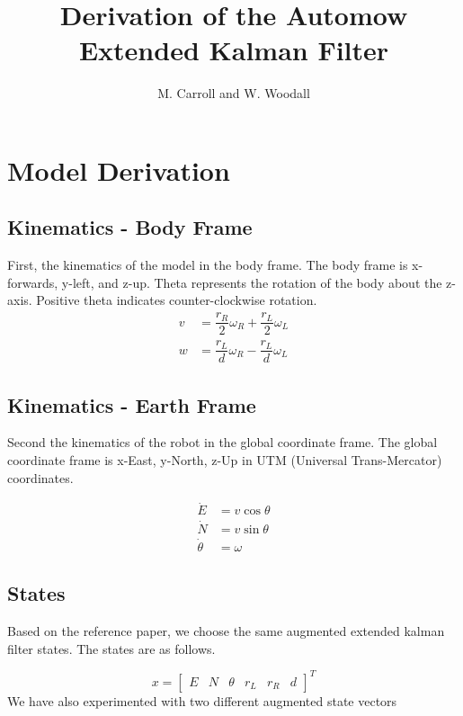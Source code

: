 \documentclass[11pt]{amsart}
\title{Derivation of the Automow Extended Kalman Filter}
\author{M. Carroll and W. Woodall}
\date{}                                           %
\begin{document}
\maketitle
\section{Model Derivation}
\subsection{Kinematics - Body Frame}
First, the kinematics of the model in the body frame.  The body frame is x-forwards, y-left, and z-up.  Theta represents the rotation of the body about the z-axis.  Positive theta indicates counter-clockwise rotation.\\

\begin{align}
v &= \dfrac{r_R}{2} \omega_R + \dfrac{r_L}{2} \omega_L \\
w &= \dfrac{r_L}{d} \omega_R - \dfrac{r_L}{d} \omega_L
\end{align}

\subsection{Kinematics - Earth Frame}
Second the kinematics of the robot in the global coordinate frame.  The global coordinate frame is x-East, y-North, z-Up in UTM (Universal Trans-Mercator) coordinates.

\begin{align}
\dot{E} &= v \cos{\theta} \\
\dot{N} &= v \sin{\theta} \\
\dot{\theta} &= \omega
\end{align}

\subsection{States}

Based on the reference paper, we choose the same augmented extended kalman filter states. The states are as follows.

\begin{equation}
x = \begin{bmatrix}
E & N & \theta & r_L & r_R & d 
\end{bmatrix}^T
\end{equation}
We have also experimented with two different augmented state vectors
\end{document}
